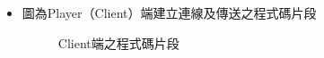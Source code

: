 \documentclass[12pt]{article}  %
\theoremstyle{plain}
\begin{document}
\begin{itemize}
\item 圖為Player（Client）端建立連線及傳送之程式碼片段
\begin{figure}[h]  %
\quad
{}
\caption{Client端之程式碼片段}
\end{figure}
\newpage


\end{itemize}
\end{document}
